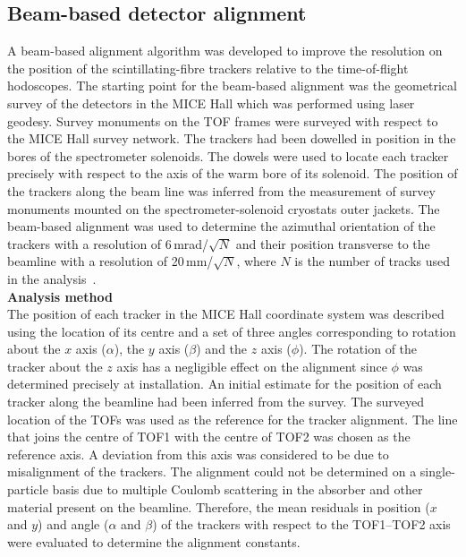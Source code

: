 


\subsection{Beam-based detector alignment}
\label{SubSect:DA}

A beam-based alignment algorithm was developed to improve the
resolution on the position of the scintillating-fibre trackers
relative to the time-of-flight hodoscopes.
The starting point for the beam-based alignment was the geometrical
survey of the detectors in the MICE Hall which was performed using
laser geodesy. 
Survey monuments on the TOF frames were surveyed with respect to the
MICE Hall survey network.
The trackers had been dowelled in position in the bores of the
spectrometer solenoids.
The dowels were used to locate each tracker precisely with respect to the axis of the warm bore of its
solenoid.
The position of the trackers along the beam line was inferred from the
measurement of survey monuments mounted on the spectrometer-solenoid
cryostats outer jackets.
The beam-based alignment was used to determine the azimuthal
orientation of the trackers with a resolution of 6\,mrad/$\sqrt{N}$
and their position transverse to the beamline with a resolution of
20\,mm/$\sqrt{N}$, where $N$ is the number of tracks used in the
analysis~\cite{2018arXiv1805.06623T}. \\

\noindent\textbf{Analysis method} \\
\label{SubSect:DA_Analysis}
\noindent The position of each tracker in the MICE Hall coordinate
system was described using the location of its centre and a set of
three angles corresponding to rotation about the $x$ axis ($\alpha$),
the $y$ axis ($\beta$) and the $z$ axis ($\phi$).
The rotation of the tracker about the $z$ axis has a negligible effect
on the alignment since $\phi$ was determined precisely
at installation.
An initial estimate for the position of each tracker along the beamline
had been inferred from the survey.
The surveyed location of the TOFs was used as the reference for the
tracker alignment.
The line that joins the centre of TOF1 with the centre of TOF2 was
chosen as the reference axis.
A deviation from this axis was considered to be due to misalignment
of the trackers.
The alignment could not be determined on a single-particle basis due
to multiple Coulomb scattering in the absorber and other material
present on the beamline.
Therefore, the mean residuals in position ($x$ and $y$) and angle
($\alpha$ and $\beta$) of the trackers with respect to the TOF1--TOF2
axis were evaluated to determine the alignment constants.

